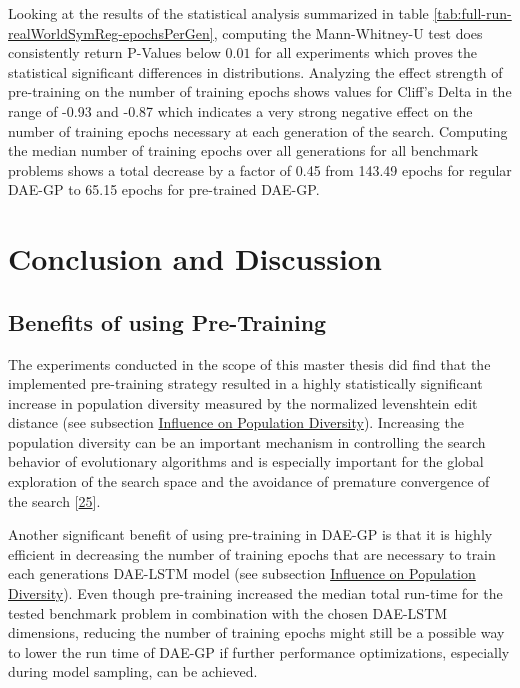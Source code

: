 \documentclass[
  11pt,
]{article}
\begin{document}
Looking at the results of the statistical analysis summarized in table \ref{tab:full-run-realWorldSymReg-epochsPerGen}, computing the Mann-Whitney-U test does consistently return P-Values below \(0.01\) for all experiments which proves the statistical significant differences in distributions.
Analyzing the effect strength of pre-training on the number of training epochs shows values for Cliff's Delta in the range of -0.93 and -0.87 which indicates a very strong negative effect on the number of training epochs necessary at each generation of the search.
Computing the median number of training epochs over all generations for all benchmark problems shows a total decrease by a factor of 0.45 from 143.49 epochs for regular DAE-GP to 65.15 epochs for pre-trained DAE-GP.

\hypertarget{conclusion-and-discussion}{%
\section{Conclusion and Discussion}\label{conclusion-and-discussion}}

\hypertarget{benefits-of-using-pre-training}{%
\subsection{Benefits of using Pre-Training}\label{benefits-of-using-pre-training}}

The experiments conducted in the scope of this master thesis did find that the implemented pre-training strategy resulted in a highly statistically significant increase in population diversity measured by the normalized levenshtein edit distance (see subsection \protect\hyperlink{influence-on-population-diversity}{Influence on Population Diversity}).
Increasing the population diversity can be an important mechanism in controlling the search behavior of evolutionary algorithms and is especially important for the global exploration of the search space and the avoidance of premature convergence of the search {[}\protect\hyperlink{ref-Sudholt2020}{25}{]}.

Another significant benefit of using pre-training in DAE-GP is that it is highly efficient in decreasing the number of training epochs that are necessary to train each generations DAE-LSTM model (see subsection \protect\hyperlink{influence-on-population-diversity}{Influence on Population Diversity}).
Even though pre-training increased the median total run-time for the tested benchmark problem in combination with the chosen DAE-LSTM dimensions, reducing the number of training epochs might still be a possible way to lower the run time of DAE-GP if further performance optimizations, especially during model sampling, can be achieved.
\end{document}
